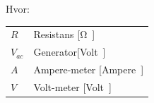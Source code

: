 Hvor:
\begin{table}[H]
	\begin{tabular}{l|l}
	$R$     & Resistans [\si \ohm] \\
	$V_{ac}$ 	   &  Generator[\si Volt] \\
	$A$ 	   & Ampere-meter [\si Ampere] \\
	$V$			& Volt-meter [\si Volt]
	\end{tabular}
\end{table}
